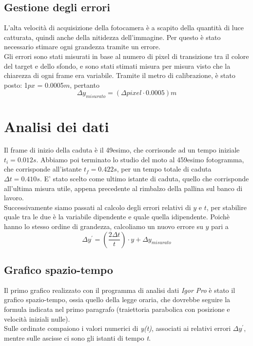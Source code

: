 \documentclass[12pt, a4paper]{article}
\begin{document}
\newpage



\subsection{Gestione degli errori}
L'alta velocità di acquisizione della fotocamera è a scapito della quantità di luce catturata, quindi anche della nitidezza dell'immagine. Per questo è stato necessario stimare ogni grandezza tramite un errore. \\
Gli errori sono stati misurati in base al numero di pixel di transizione tra il colore del target e dello sfondo, e sono stati stimati misura per misura visto che la chiarezza di ogni frame era variabile. Tramite il metro di calibrazione, è stato posto: 1$px$ = 0.0005$m$, pertanto
\begin{equation*}
    \Delta y_{misurato}= (\Delta pixel \cdot 0.0005)m
\end{equation*}


\section{Analisi dei dati}
Il frame di inizio della caduta è il 49esimo, che corrisonde ad un tempo iniziale \textit{$t_i = 0.012s$}.
Abbiamo poi terminato lo studio del moto al 459esimo fotogramma, che corrisponde all'istante \textit{$t_f = 0.422s$}, per un tempo totale di caduta \textit{$\Delta t = 0.410s$}. 
E' stato scelto come ultimo istante di caduta, quello che corrisponde all'ultima misura utile, appena precedente al rimbalzo della pallina sul banco di lavoro.\\

Successivamente siamo passati al calcolo degli errori relativi di $y$ e $t$, per stabilire quale tra le due è la variabile dipendente e quale quella idipendente. Poichè hanno lo stesso ordine di grandezza, calcoliamo un nuovo errore su $y$ pari a 
\begin{equation*}
   \Delta y^{'} = (\frac{2\Delta t}{t})\cdot y + \Delta y_{misurato}
\end{equation*}
\subsection{Grafico spazio-tempo}
Il primo grafico realizzato con il programma di analisi dati \textit{Igor Pro} è stato il grafico spazio-tempo, ossia quello della legge oraria, che dovrebbe seguire la formula indicata nel primo paragrafo (traiettoria parabolica con posizione e velocità iniziali nulle).\\ 
Sulle ordinate compaiono i valori numerici di \textit{y(t)}, associati ai relativi errori  \textit{$\Delta y^{'}$}, mentre sulle ascisse ci sono gli istanti di tempo \textit{t}. 
\end{document}
